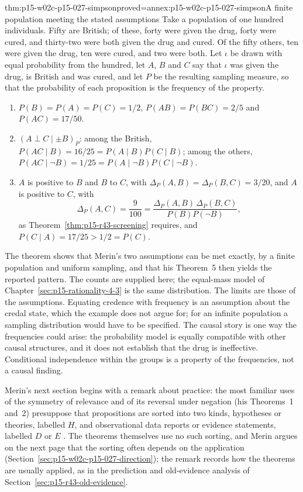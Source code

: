 \begin{hbtheorem}{thm:p15-w02c-p15-027-simpson}{proved=annex:p15-w02c-p15-027-simpson}{A finite population meeting the stated assumptions}
Take a population of one hundred individuals. Fifty are British; of
these, forty were given the drug, forty were cured, and thirty-two were
both given the drug and cured. Of the fifty others, ten were given the
drug, ten were cured, and two were both. Let \(\iota\) be drawn with
equal probability from the hundred, let \(A\), \(B\) and \(C\) say that
\(\iota\) was given the drug, is British and was cured, and let \(P\)
be the resulting sampling measure, so that the probability of each
proposition is the frequency of the property.
\begin{enumerate}
\item \(P(B)=P(A)=P(C)=1/2\), \(P(AB)=P(BC)=2/5\) and \(P(AC)=17/50\).
\item \((A\perp C\mid\pm B)_P\): among the British,
  \(P(AC\mid B)=16/25=P(A\mid B)P(C\mid B)\); among the others,
  \(P(AC\mid\neg B)=1/25=P(A\mid\neg B)P(C\mid\neg B)\).
\item \(A\) is positive to \(B\) and \(B\) to \(C\), with
  \(\Delta_P(A,B)=\Delta_P(B,C)=3/20\), and \(A\) is positive to \(C\),
  with
  \[
   \Delta_P(A,C)=\frac{9}{100}
     =\frac{\Delta_P(A,B)\,\Delta_P(B,C)}{P(B)P(\neg B)},
  \]
  as Theorem~\ref{thm:p15-r43-screening} requires, and
  \(P(C\mid A)=17/25>1/2=P(C)\).
\end{enumerate}
\end{hbtheorem}

The theorem shows that Merin's two assumptions can be met exactly, by a
finite population and uniform sampling, and that his Theorem~5 then
yields the reported pattern. The counts are supplied here; the
equal-mass model of Chapter~\ref{sec:p15-rationality-4-3} is the same
distribution. The limits are those of the assumptions. Equating credence
with frequency is an assumption about the credal state, which the
example does not argue for; for an infinite population a sampling
distribution would have to be specified. The causal story is one way the
frequencies could arise: the probability model is equally compatible
with other causal structures, and it does not establish that the drug is
ineffective. Conditional independence within the groups is a property of
the frequencies, not a causal finding.

Merin's next section begins with a remark about practice: the most
familiar uses of the symmetry of relevance and of its reversal under
negation (his Theorems~1 and~2) presuppose that propositions are sorted
into two kinds, hypotheses or theories, labelled \(H\), and observational
data reports or evidence statements, labelled \(D\) or \(E\)
\cite[p.~267]{Merin2021Relevance}. The theorems themselves use no such
sorting, and Merin argues on the next page that the sorting often
depends on the application (Section~\ref{sec:p15-w02c-p15-027-direction});
the remark records how the theorems are usually applied, as in the
prediction and old-evidence analysis of
Section~\ref{sec:p15-r43-old-evidence}.

